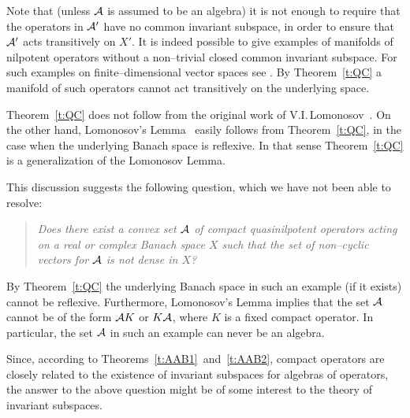 \goodbreak

\begin{rem}
Note that (unless ${\cal A}$ is assumed to be an algebra) it is not
enough to require that the operators in ${\cal A}'$ have no common
invariant subspace, in order to ensure that ${\cal A}'$ acts
transitively on $X'$. It is indeed possible to give examples of
manifolds of nilpotent operators without a non--trivial closed
common invariant subspace. For such examples on
finite--dimensional vector spaces see \cite{MOR91}. By
Theorem~\ref{t:QC} a manifold of such operators cannot act
transitively on the underlying space.
\end{rem}

Theorem~\ref{t:QC} does not follow from the original work of
V.I.\,Lomonosov~\cite{Lom73}. On the other hand, Lomonosov's
Lemma~\cite{Lom73} easily follows from Theorem~\ref{t:QC}, in
the case when the underlying Banach space is reflexive. In that
sense Theorem~\ref{t:QC} is a generalization of the Lomonosov
Lemma.

{\nobreak This discussion suggests the following question,
which we have not been able to resolve: \nobreak
\begin{quote}
{\em Does there exist a convex set ${\cal A}$ of compact
quasinilpotent operators acting on a real or complex Banach
space $X$ such that the set of non--cyclic vectors for ${\cal A}$ is
{\em not} dense in $X$? }
\end{quote}
}

\medskip

By Theorem~\ref{t:QC} the underlying Banach space in such an
example (if it exists) cannot be reflexive. Furthermore,
Lomonosov's Lemma implies that the set ${\cal A}$ cannot be of the
form ${\cal A} K$ or $K {\cal A}$, where $K$ is a fixed compact operator.
In particular, the set ${\cal A}$ in such an example can never be an
algebra.

\medskip

Since, according to Theorems~\ref{t:AAB1}~and~\ref{t:AAB2},
compact operators are closely related to the existence of
invariant subspaces for algebras of operators, the answer to
the above question might be of some interest to the theory of
invariant subspaces.

